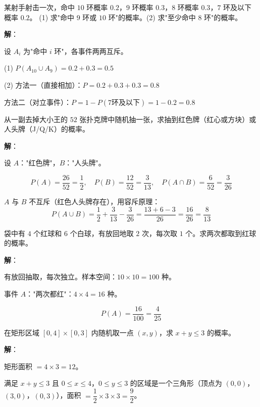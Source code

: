 \documentclass[12pt, a4paper]{ctexart}
\begin{document}
\begin{examplebox}[【例5】互斥与对立事件]
某射手射击一次，命中 $10$ 环概率 $0.2$，$9$ 环概率 $0.3$，$8$ 环概率 $0.3$，$7$ 环及以下概率 $0.2$。
(1) 求"命中 $9$ 环或 $10$ 环"的概率。(2) 求"至少命中 $8$ 环"的概率。
\end{examplebox}

\textbf{解}：

设 $A_i$ 为"命中 $i$ 环"，各事件两两互斥。

(1) $P(A_{10} \cup A_9) = 0.2 + 0.3 = 0.5$

(2) 方法一（直接相加）：$P = 0.2 + 0.3 + 0.3 = 0.8$

方法二（对立事件）：$P = 1 - P(\text{7环及以下}) = 1 - 0.2 = 0.8$

\begin{examplebox}
从一副去掉大小王的 $52$ 张扑克牌中随机抽一张，求抽到红色牌（红心或方块）或人头牌（J/Q/K）的概率。
\end{examplebox}

\textbf{解}：

设 $A$："红色牌"，$B$："人头牌"。

\[
P(A) = \frac{26}{52} = \frac{1}{2}, \quad P(B) = \frac{12}{52} = \frac{3}{13}, \quad P(A \cap B) = \frac{6}{52} = \frac{3}{26}
\]

$A$ 与 $B$ 不互斥（红色人头牌存在），用容斥原理：
\[
P(A \cup B) = \frac{1}{2} + \frac{3}{13} - \frac{3}{26} = \frac{13+6-3}{26} = \frac{16}{26} = \frac{8}{13}
\]

\begin{examplebox}
袋中有 $4$ 个红球和 $6$ 个白球，有放回地取 $2$ 次，每次取 $1$ 个。求两次都取到红球的概率。
\end{examplebox}

\textbf{解}：

有放回抽取，每次独立。样本空间：$10 \times 10 = 100$ 种。

事件 $A$："两次都红"：$4 \times 4 = 16$ 种。

\[
P(A) = \frac{16}{100} = \frac{4}{25}
\]

\begin{examplebox}
在矩形区域 $[0, 4] \times [0, 3]$ 内随机取一点 $(x, y)$，求 $x + y \leqslant 3$ 的概率。
\end{examplebox}

\textbf{解}：

矩形面积 $= 4 \times 3 = 12$。

满足 $x + y \leqslant 3$ 且 $0 \leqslant x \leqslant 4$，$0 \leqslant y \leqslant 3$ 的区域是一个三角形（顶点为 $(0,0)$，$(3,0)$，$(0,3)$），面积 $= \dfrac{1}{2} \times 3 \times 3 = \dfrac{9}{2}$。
\end{document}
